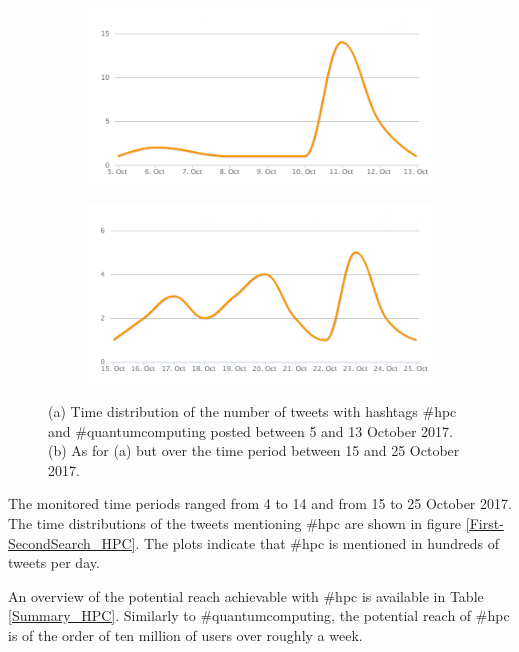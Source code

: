 \begin{figure}
 \centering
 \begin{subfigure}[b]{0.95\textwidth}
   \includegraphics[width=1\linewidth]{Images/FirstSearch_HPC-QuantumComputing.png}
   \caption{} 
 \end{subfigure}

 \begin{subfigure}[b]{0.95\textwidth}
   \includegraphics[width=1\linewidth]{Images/SecondSearch_HPC-QuantumComputing.png}
   \caption{}
 \end{subfigure}
 \caption{(a) Time distribution of the number of tweets with hashtags \#hpc and \#quantumcomputing posted between 5 and 13 October 2017. (b) As for (a) but over the time period between 15 and 25 October 2017.} 
 \label{First-SecondSearch_HPC-QuantumComputing}
\end{figure}

The monitored time periods ranged from 4 to 14 and from 15 to 25 October 2017. The time distributions of the tweets mentioning \#hpc are shown in figure \ref{First-SecondSearch_HPC}. The plots indicate that \#hpc is mentioned in hundreds of tweets per day.

An overview of the potential reach achievable with \#hpc is available in Table \ref{Summary_HPC}. Similarly to \#quantumcomputing, the potential reach of \#hpc is of the order of ten million of users over roughly a week. 

